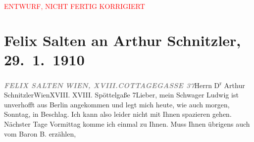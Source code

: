 
\begin{center}
            \textcolor{red}{ENTWURF, NICHT FERTIG KORRIGIERT}
                      \end{center}
            
         
         \renewcommand{\erwaehntePersonen}{Personen: Alfred von Berger, Ludwig Metzl}
         \renewcommand{\erwaehnteOrte}{Orte: Berlin, Cottagegasse, Edmund-Weiß-Gasse, Wien, XVIII., Währing}
         \renewcommand{\erwaehnteWerke}{Werke: Der junge Medardus. Dramatische Historie in einem Vorspiel und fünf Aufzügen}
               \section[Felix Salten an Arthur Schnitzler, 29. 1. 1910]{ Felix Salten an Arthur Schnitzler, 29. 1. 1910}\nopagebreak{}\rehead{ }\begin{ledgroupsized}[t]{13cm}\normalsize\beginnumbering \toendnotes[C]{\smallbreak\pagebreak[2]} 
\pstart{}{\pb}\textcolor{gray}{\textbf{\textit{FELIX SALTEN }}}\pend{}\pstart{}\textcolor{gray}{\textbf{\textit{WIEN, XVIII.}}}\pend{}\pstart{}\textcolor{gray}{\textbf{\textit{COTTAGEGASSE 37}}}\pend{}{\bigskip}\pstart{}Herrn D\textsuperscript{r} Arthur Schnitzler\pend{}\pstart{}Wien\pend{}\pstart{}XVIII. XVIII. Spöttelgaße 7\pend{}{\bigskip}\pstart{}{\pb}Lieber,\pend\pstart
           mein Schwager Ludwig ist unverhofft aus Berlin angekommen und legt mich
               heute, wie auch morgen, Sonntag, in Beschlag. Ich kann also
               leider nicht mit Ihnen spazieren gehen. Nächster Tage Vormittag komme ich einmal zu
               Ihnen. Muss Ihnen übrigens auch vom Baron B. erzählen,

\end{ledgroupsized}
